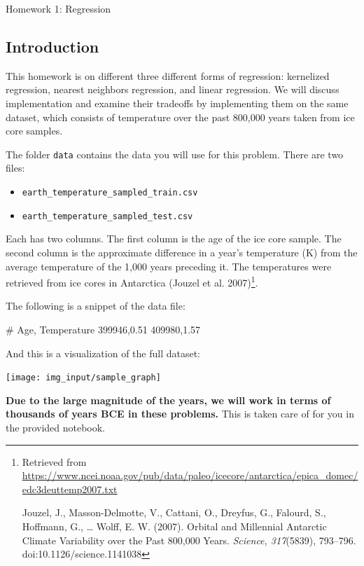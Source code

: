\documentclass[submit]{harvardml}
\begin{document}
\begin{center}
  {\Large Homework 1: Regression}\\
\end{center}

\subsection*{Introduction}
This homework is on different three different forms of regression:
kernelized regression, nearest neighbors regression, and linear
regression.  We will discuss implementation and examine their
tradeoffs by implementing them on the same dataset, which consists of
temperature over the past 800,000 years taken from ice core samples.

The folder \verb|data| contains the data you will use for this
problem. There are two files:
\begin{itemize}
  \item \verb|earth_temperature_sampled_train.csv|
  \item \verb|earth_temperature_sampled_test.csv|
\end{itemize}

Each has two columns.  The first column is the age of the ice core
sample.  The second column is the approximate difference in a year's temperature (K)
from the average temperature of the 1,000 years preceding it. The temperatures were retrieved from ice cores in
Antarctica (Jouzel et al. 2007)\footnote{Retrieved from
  \url{https://www.ncei.noaa.gov/pub/data/paleo/icecore/antarctica/epica_domec/edc3deuttemp2007.txt}

  Jouzel, J., Masson-Delmotte, V., Cattani, O., Dreyfus, G., Falourd,
  S., Hoffmann, G., … Wolff, E. W. (2007). Orbital and Millennial
  Antarctic Climate Variability over the Past 800,000 Years.
  \emph{Science, 317}(5839), 793–796. doi:10.1126/science.1141038}.

The following is a snippet of the data file:

\begin{csv}
  # Age, Temperature
  399946,0.51
  409980,1.57
\end{csv}

\noindent And this is a visualization of the full dataset:
\begin{center}
  \texttt{[image: img\_input/sample\_graph]}
\end{center}
\noindent


\textbf{Due to the large magnitude of the years, we will work in terms
  of thousands of years BCE in these problems.} This is taken care of
for you in the provided notebook.
\end{document}
